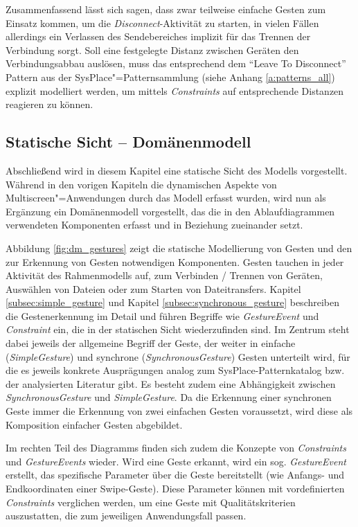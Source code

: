 Zusammenfassend lässt sich sagen, dass zwar teilweise einfache Gesten zum Einsatz kommen, um die \textit{Disconnect}-Aktivität zu starten, in vielen Fällen allerdings ein Verlassen des Sendebereiches implizit für das Trennen der Verbindung sorgt. Soll eine festgelegte Distanz zwischen Geräten den Verbindungsabbau auslösen, muss das entsprechend dem "`Leave To Disconnect"' Pattern aus der SysPlace"=Patternsammlung (siehe Anhang \ref{a:patterns_all}) explizit modelliert werden, um \zb mittels \textit{Constraints} auf entsprechende Distanzen reagieren zu können.

\subsection{Statische Sicht -- Domänenmodell}
\label{subsec:domain_model}
Abschließend wird in diesem Kapitel eine statische Sicht des Modells vorgestellt. Während in den vorigen Kapiteln die dynamischen Aspekte von Multiscreen"=Anwendungen durch das Modell erfasst wurden, wird nun als Ergänzung ein Domänenmodell vorgestellt, das die in den Ablaufdiagrammen verwendeten Komponenten erfasst und in Beziehung zueinander setzt.

Abbildung \ref{fig:dm_gestures} zeigt die statische Modellierung von Gesten und den zur Erkennung von Gesten notwendigen Komponenten. Gesten tauchen in jeder Aktivität des Rahmenmodells auf, zum Verbinden / Trennen von Geräten, Auswählen von Dateien oder zum Starten von Dateitransfers. Kapitel \ref{subsec:simple_gesture} und Kapitel \ref{subsec:synchronous_gesture} beschreiben die Gestenerkennung im Detail und führen Begriffe wie \textit{GestureEvent} und \textit{Con\-straint} ein, die in der statischen Sicht wiederzufinden sind. Im Zentrum steht dabei jeweils der allgemeine Begriff der Geste, der weiter in einfache (\textit{SimpleGesture}) und synchrone (\textit{SynchronousGesture}) Gesten unterteilt wird, für die es jeweils konkrete Ausprägungen analog zum SysPlace-Patternkatalog bzw. der analysierten Literatur gibt.  Es besteht zudem eine Abhängigkeit zwischen \textit{SynchronousGesture} und \textit{SimpleGesture}. Da die Erkennung einer synchronen Geste immer die Erkennung von zwei einfachen Gesten voraussetzt, wird diese als Komposition einfacher Gesten abgebildet.

Im rechten Teil des Diagramms finden sich zudem die Konzepte von \textit{Constraints} und \textit{GestureEvents} wieder. Wird eine Geste erkannt, wird ein sog. \textit{GestureEvent} erstellt, das spezifische Parameter über die Geste bereitstellt (wie \zb Anfangs- und Endkoordinaten einer Swipe-Geste). Diese Parameter können mit vordefinierten \textit{Constraints} verglichen werden, um eine Geste mit Qualitätskriterien auszustatten, die zum jeweiligen Anwendungsfall passen.


